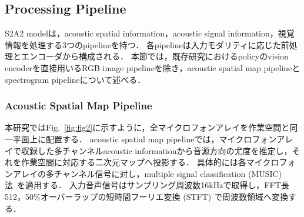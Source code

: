 \documentclass{article}
\begin{document}

\subsection{Processing Pipeline}
\label{sec:pipelines}

S2A2 modelは，acoustic spatial information，acoustic signal information，視覚情報を処理する3つのpipelineを持つ．
各pipelineは入力モダリティに応じた前処理とエンコーダから構成される．
本節では，既存研究におけるpolicyのvision encoderを直接用いるRGB image pipelineを除き，acoustic spatial map pipelineとspectrogram pipelineについて述べる．

\subsubsection{Acoustic Spatial Map Pipeline}
\label{sec:doa}
	本研究ではFig.~\ref{fig:fig2}に示すように，全マイクロフォンアレイを作業空間と同一平面上に配置する．
	acoustic spatial map pipelineでは，マイクロフォンアレイで収録した多チャンネルacoustic informationから音源方向の尤度を推定し，それを作業空間に対応する二次元マップへ投影する．
	具体的には各マイクロフォンアレイの多チャンネル信号に対し，multiple signal classification (MUSIC) 法~\citep{schmidt1986music}を適用する．
	入力音声信号はサンプリング周波数16kHzで取得し，FFT長512，50\%オーバーラップの短時間フーリエ変換 (STFT) で周波数領域へ変換する．
	
\end{document}

